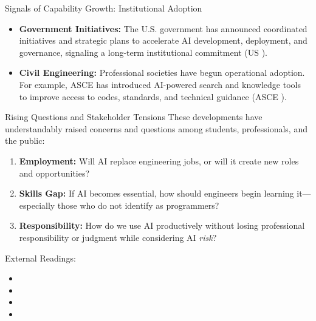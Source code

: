 \documentclass[german,10pt]{beamer}
\begin{document}
\begin{frame}{Signals of Capability Growth: Institutional Adoption}
    \justifying
    \begin{itemize}
        \item \textbf{Government Initiatives:} The U.S. government has announced coordinated initiatives and strategic plans to accelerate AI development, deployment, and governance, signaling a long-term institutional commitment (US ).
        \item \textbf{Civil Engineering:} Professional societies have begun operational adoption. For example, ASCE has introduced AI-powered search and knowledge tools to improve access to codes, standards, and technical guidance (ASCE ).
    \end{itemize}
\end{frame}

\begin{frame}{Rising Questions and Stakeholder Tensions}
    \justifying
    These developments have understandably raised concerns and questions among students, professionals, and the public:
    \begin{enumerate}
        \item \textbf{Employment:} Will AI replace engineering jobs, or will it create new roles and opportunities?
        \item \textbf{Skills Gap:} If AI becomes essential, how should engineers begin learning it—especially those who do not identify as programmers?
        \item \textbf{Responsibility:} How do we use AI productively without losing professional responsibility or judgment while considering AI \textit{risk}?
    \end{enumerate}
    \begin{warningbox}{ External Readings:}
        \begin{itemize}
            \item {} 
            \item {}
            \item {}
            \item {}
   
        
        \end{itemize}
    \end{warningbox}
    
\end{frame}
\end{document}
